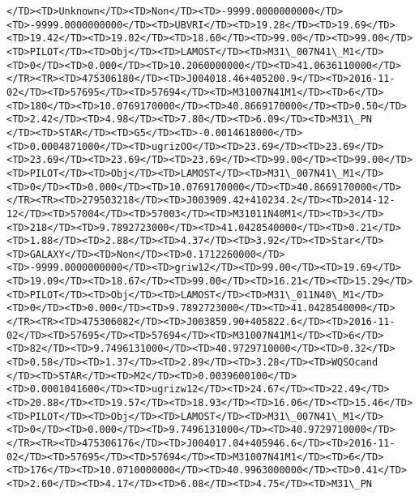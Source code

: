 \documentclass[11pt]{article}
\begin{document}
\begin{Verbatim}[commandchars=\\\{\}]
</TD><TD>Unknown</TD><TD>Non</TD><TD>-9999.0000000000</TD><TD>-9999.0000000000</TD><TD>UBVRI</TD><TD>19.28</TD><TD>19.69</TD><TD>19.42</TD><TD>19.02</TD><TD>18.60</TD><TD>99.00</TD><TD>99.00</TD><TD>PILOT</TD><TD>Obj</TD><TD>LAMOST</TD><TD>M31\_007N41\_M1</TD><TD>0</TD><TD>0.000</TD><TD>10.2060000000</TD><TD>41.0636110000</TD></TR><TR><TD>475306180</TD><TD>J004018.46+405200.9</TD><TD>2016-11-02</TD><TD>57695</TD><TD>57694</TD><TD>M31007N41M1</TD><TD>6</TD><TD>180</TD><TD>10.0769170000</TD><TD>40.8669170000</TD><TD>0.50</TD><TD>2.42</TD><TD>4.98</TD><TD>7.80</TD><TD>6.09</TD><TD>M31\_PN    </TD><TD>STAR</TD><TD>G5</TD><TD>-0.0014618000</TD><TD>0.0004871000</TD><TD>ugrizOO</TD><TD>23.69</TD><TD>23.69</TD><TD>23.69</TD><TD>23.69</TD><TD>23.69</TD><TD>99.00</TD><TD>99.00</TD><TD>PILOT</TD><TD>Obj</TD><TD>LAMOST</TD><TD>M31\_007N41\_M1</TD><TD>0</TD><TD>0.000</TD><TD>10.0769170000</TD><TD>40.8669170000</TD></TR><TR><TD>279503218</TD><TD>J003909.42+410234.2</TD><TD>2014-12-12</TD><TD>57004</TD><TD>57003</TD><TD>M31011N40M1</TD><TD>3</TD><TD>218</TD><TD>9.7892723000</TD><TD>41.0428540000</TD><TD>0.21</TD><TD>1.88</TD><TD>2.88</TD><TD>4.37</TD><TD>3.92</TD><TD>Star</TD><TD>GALAXY</TD><TD>Non</TD><TD>0.1712260000</TD><TD>-9999.0000000000</TD><TD>griw12</TD><TD>99.00</TD><TD>19.69</TD><TD>19.09</TD><TD>18.67</TD><TD>99.00</TD><TD>16.21</TD><TD>15.29</TD><TD>PILOT</TD><TD>Obj</TD><TD>LAMOST</TD><TD>M31\_011N40\_M1</TD><TD>0</TD><TD>0.000</TD><TD>9.7892723000</TD><TD>41.0428540000</TD></TR><TR><TD>475306082</TD><TD>J003859.90+405822.6</TD><TD>2016-11-02</TD><TD>57695</TD><TD>57694</TD><TD>M31007N41M1</TD><TD>6</TD><TD>82</TD><TD>9.7496131000</TD><TD>40.9729710000</TD><TD>0.32</TD><TD>0.58</TD><TD>1.37</TD><TD>2.89</TD><TD>3.28</TD><TD>WQSOcand  </TD><TD>STAR</TD><TD>M2</TD><TD>0.0039600100</TD><TD>0.0001041600</TD><TD>ugrizw12</TD><TD>24.67</TD><TD>22.49</TD><TD>20.88</TD><TD>19.57</TD><TD>18.93</TD><TD>16.06</TD><TD>15.46</TD><TD>PILOT</TD><TD>Obj</TD><TD>LAMOST</TD><TD>M31\_007N41\_M1</TD><TD>0</TD><TD>0.000</TD><TD>9.7496131000</TD><TD>40.9729710000</TD></TR><TR><TD>475306176</TD><TD>J004017.04+405946.6</TD><TD>2016-11-02</TD><TD>57695</TD><TD>57694</TD><TD>M31007N41M1</TD><TD>6</TD><TD>176</TD><TD>10.0710000000</TD><TD>40.9963000000</TD><TD>0.41</TD><TD>2.60</TD><TD>4.17</TD><TD>6.08</TD><TD>4.75</TD><TD>M31\_PN    
\end{Verbatim}
\end{document}
